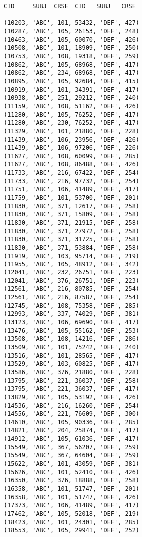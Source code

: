 
\begin{verbatim}
CID     SUBJ  CRSE  CID   SUBJ   CRSE

(10203, 'ABC', 101, 53432, 'DEF', 427)
(10287, 'ABC', 105, 26153, 'DEF', 248)
(10463, 'ABC', 105, 60070, 'DEF', 426)
(10508, 'ABC', 101, 18909, 'DEF', 250)
(10753, 'ABC', 108, 19318, 'DEF', 259)
(10862, 'ABC', 105, 68968, 'DEF', 417)
(10862, 'ABC', 234, 68968, 'DEF', 417)
(10895, 'ABC', 105, 92684, 'DEF', 415)
(10919, 'ABC', 101, 34391, 'DEF', 417)
(10938, 'ABC', 251, 29212, 'DEF', 240)
(11159, 'ABC', 108, 51162, 'DEF', 426)
(11280, 'ABC', 105, 76252, 'DEF', 417)
(11280, 'ABC', 230, 76252, 'DEF', 417)
(11329, 'ABC', 101, 21880, 'DEF', 228)
(11439, 'ABC', 106, 23956, 'DEF', 426)
(11439, 'ABC', 106, 97206, 'DEF', 226)
(11627, 'ABC', 108, 60099, 'DEF', 285)
(11627, 'ABC', 108, 86488, 'DEF', 426)
(11733, 'ABC', 216, 67422, 'DEF', 254)
(11733, 'ABC', 216, 97732, 'DEF', 254)
(11751, 'ABC', 106, 41489, 'DEF', 417)
(11759, 'ABC', 101, 53700, 'DEF', 201)
(11830, 'ABC', 371, 12617, 'DEF', 258)
(11830, 'ABC', 371, 15809, 'DEF', 258)
(11830, 'ABC', 371, 21915, 'DEF', 258)
(11830, 'ABC', 371, 27972, 'DEF', 258)
(11830, 'ABC', 371, 31725, 'DEF', 258)
(11830, 'ABC', 371, 53884, 'DEF', 258)
(11919, 'ABC', 103, 95714, 'DEF', 219)
(11955, 'ABC', 105, 48912, 'DEF', 342)
(12041, 'ABC', 232, 26751, 'DEF', 223)
(12041, 'ABC', 376, 26751, 'DEF', 223)
(12561, 'ABC', 216, 80785, 'DEF', 254)
(12561, 'ABC', 216, 87587, 'DEF', 254)
(12745, 'ABC', 108, 75358, 'DEF', 285)
(12993, 'ABC', 337, 74029, 'DEF', 381)
(13123, 'ABC', 106, 69690, 'DEF', 417)
(13476, 'ABC', 105, 55162, 'DEF', 253)
(13508, 'ABC', 108, 14216, 'DEF', 286)
(13509, 'ABC', 101, 75242, 'DEF', 240)
(13516, 'ABC', 101, 28565, 'DEF', 417)
(13529, 'ABC', 103, 60825, 'DEF', 417)
(13586, 'ABC', 376, 21880, 'DEF', 228)
(13795, 'ABC', 221, 36037, 'DEF', 258)
(13795, 'ABC', 221, 36037, 'DEF', 417)
(13829, 'ABC', 105, 53192, 'DEF', 426)
(14536, 'ABC', 216, 16260, 'DEF', 254)
(14556, 'ABC', 221, 76609, 'DEF', 300)
(14610, 'ABC', 105, 90336, 'DEF', 285)
(14821, 'ABC', 204, 25874, 'DEF', 417)
(14912, 'ABC', 105, 61036, 'DEF', 417)
(15549, 'ABC', 367, 56207, 'DEF', 259)
(15549, 'ABC', 367, 64604, 'DEF', 259)
(15622, 'ABC', 101, 43059, 'DEF', 381)
(15626, 'ABC', 101, 52410, 'DEF', 426)
(16350, 'ABC', 376, 18888, 'DEF', 258)
(16358, 'ABC', 101, 51747, 'DEF', 201)
(16358, 'ABC', 101, 51747, 'DEF', 426)
(17373, 'ABC', 106, 41489, 'DEF', 417)
(17462, 'ABC', 105, 52018, 'DEF', 219)
(18423, 'ABC', 101, 24301, 'DEF', 285)
(18553, 'ABC', 105, 29941, 'DEF', 252)

\end{verbatim}
